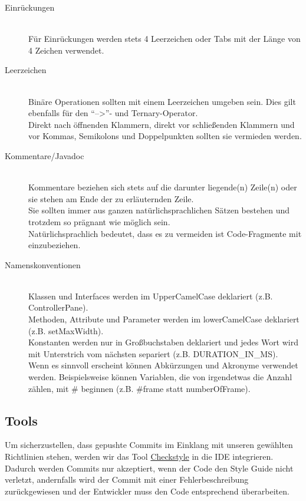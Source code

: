 \begin{description}
\item[Einrückungen]\hfill 
\\Für Einrückungen werden stets 4 Leerzeichen oder Tabs mit der Länge von 4 Zeichen verwendet.
\end{description}

\begin{description}
\item[Leerzeichen]\hfill 
\\Binäre Operationen sollten mit einem Leerzeichen umgeben sein. Dies gilt ebenfalls für den ``-->''- und Ternary-Operator.
\\Direkt nach öffnenden Klammern, direkt vor schließenden Klammern und vor Kommas, Semikolons und Doppelpunkten sollten sie vermieden werden.
\end{description}

\begin{description}
\item[Kommentare/Javadoc]\hfill 
\\Kommentare beziehen sich stets auf die darunter liegende(n) Zeile(n) oder sie stehen am Ende der zu erläuternden Zeile.
\\Sie sollten immer aus ganzen natürlichsprachlichen Sätzen bestehen und trotzdem so prägnant wie möglich sein.
\\Natürlichsprachlich bedeutet, dass es zu vermeiden ist Code-Fragmente mit einzubeziehen.
\end{description}

\begin{description}
\item[Namenskonventionen]\hfill 
\\Klassen und Interfaces werden im UpperCamelCase deklariert (z.B. ControllerPane).
\\Methoden, Attribute und Parameter werden im lowerCamelCase deklariert (z.B. setMaxWidth).
\\Konstanten werden nur in Großbuchstaben deklariert und jedes Wort wird mit Unterstrich vom nächsten separiert (z.B. DURATION\_IN\_MS).
\\Wenn es sinnvoll erscheint können Abkürzungen und Akronyme verwendet werden. Beispielsweise können Variablen, die von irgendetwas die Anzahl zählen, mit \# beginnen (z.B. \#frame statt numberOfFrame).
\end{description}

\subsection{Tools}
Um sicherzustellen, dass gepushte Commits im Einklang mit unseren gewählten Richtlinien stehen, werden wir das Tool \href{http://checkstyle.sourceforge.net}{Checkstyle} in die IDE integrieren. Dadurch werden Commits nur akzeptiert, wenn der Code den Style Guide nicht verletzt, andernfalls wird der Commit mit einer Fehlerbeschreibung zurückgewiesen und der Entwickler muss den Code entsprechend überarbeiten.